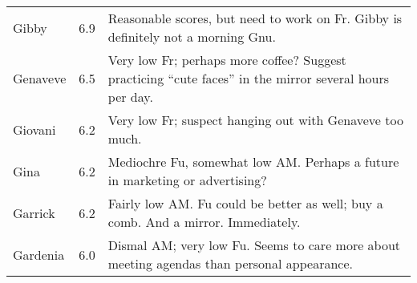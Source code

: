 \begin{landscape}
\begin{longtable}{lcp{4.5in}}
Gibby & 6.9 & Reasonable scores, but need to work on Fr.  Gibby is
  definitely not a morning Gnu. \\ 
Genaveve & 6.5 & Very low Fr; perhaps more coffee?  Suggest practicing
  ``cute faces'' in the mirror several hours per day.  \\
Giovani & 6.2 & Very low Fr; suspect hanging out with Genaveve too
  much. \\
Gina & 6.2 & Mediochre Fu, somewhat low AM.  Perhaps a future in
  marketing or advertising? \\
Garrick & 6.2 & Fairly low AM.  Fu could be better as well; buy a
  comb.  And a mirror.  Immediately.  \\
Gardenia & 6.0 & Dismal AM; very low Fu.  Seems to care more about
  meeting agendas than personal appearance. \\
\end{longtable}
\end{landscape}


%
% 
% 
